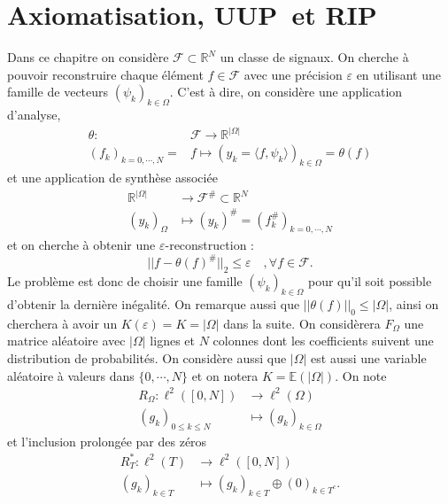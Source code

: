 \section{Axiomatisation, \textbf{UUP} et \textbf{RIP}}
Dans ce chapitre on considère $\mathcal{F} \subset \mathbb{R}^N$ un classe de signaux.
On cherche à pouvoir reconstruire chaque élément $f\in \mathcal{F}$ avec une précision $\varepsilon$ en utilisant une famille de vecteurs $(\psi_k)_{k \in \Omega}$.
\newline
C'est à dire, on considère une application d'analyse,
\begin{align}
	\theta : 	&\mathcal{F} \longrightarrow \mathbb{R}^{|\Omega|}\\
	(f_k)_{k = 0, \cdots, N} = &f \longmapsto (y_k = \langle f, \psi_k \rangle )_{k\in \Omega} = \theta(f)
\end{align}
et une application de synthèse associée
\begin{align}
	\mathbb{R}^{|\Omega|} &\longrightarrow \mathcal{F}^\# \subset \mathbb{R}^N \\
	(y_k)_\Omega &\longmapsto (y_k)^\# = (f_k ^\#)_{k = 0, \cdots, N}
\end{align}
et on cherche à obtenir une $\varepsilon$-reconstruction :
\begin{equation}
	|| f- \theta(f)^\#||_2 \leq \varepsilon \quad, \forall f \in \mathcal{F}. 
\end{equation}
Le problème est donc de choisir une famille $(\psi_k)_{k \in \Omega}$ pour qu'il soit possible d'obtenir la dernière inégalité.
\newline
On remarque aussi que $||\theta(f)||_0 \leq |\Omega|$, ainsi on cherchera à avoir un $K(\varepsilon) = K = |\Omega|$ dans la suite.
\newline
On considèrera $F_\Omega$ une matrice aléatoire avec $|\Omega|$ lignes et $N$ colonnes dont les coefficients suivent une distribution de probabilités.
On considère aussi que $|\Omega|$ est aussi une variable aléatoire à valeurs dans $\{0, \cdots, N\}$ et on notera $K = \mathbb{E}(|\Omega|)$.
On note
\begin{align}
	R_\Omega : \ell^2([0, N]) &\longrightarrow \ell^2(\Omega) \\
		(g_k)_{0\leq k\leq N} &\longmapsto (g_k)_{k\in \Omega}
\end{align}
et l'inclusion prolongée par des zéros
\begin{align}
	R_T^* : \ell^2(T) &\longrightarrow \ell^2([0,N])\\
		(g_k)_{k \in T} &\longmapsto (g_k)_{k\in T} \oplus (0)_{k\in T^c}.
\end{align}
